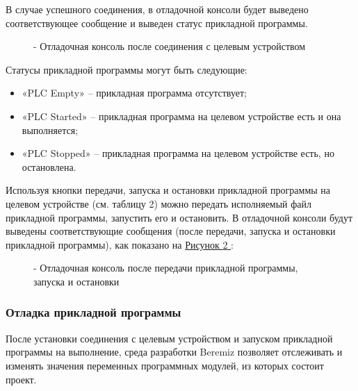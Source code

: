 \documentclass[letterpaper,10pt,russian]{sphinxmanual}
\begin{document}
В случае успешного соединения, в отладочной консоли будет выведено
соответствующее сообщение и выведен статус прикладной программы.
\begin{figure}[htbp]
\centering
\capstart

\noindent{}
\caption{- Отладочная консоль после соединения с целевым устройством}\label{usage_guide/work_with_project:image211}\end{figure}

Статусы прикладной программы могут быть следующие:
\begin{itemize}
\item {} 
«PLC Empty» – прикладная программа отсутствует;

\item {} 
«PLC Started» – прикладная программа на целевом устройстве есть и она
выполняется;

\item {} 
«PLC Stopped» – прикладная программа на целевом устройстве есть, но
остановлена.

\end{itemize}

Используя кнопки передачи, запуска и остановки прикладной программы на
целевом устройстве (см. таблицу 2) можно передать исполняемый файл
прикладной программы, запустить его и остановить. В отладочной консоли
будут выведены соответствующие сообщения (после передачи, запуска и
остановки прикладной программы), как показано на \hyperref[usage_guide/work_with_project:image212]{Рисунок \ref{usage_guide/work_with_project:image212} }:
\begin{figure}[htbp]
\centering
\capstart

\noindent{}
\caption{- Отладочная консоль после передачи прикладной программы, запуска и остановки}\label{usage_guide/work_with_project:image212}\end{figure}


\subsubsection{Отладка прикладной программы}
\label{usage_guide/work_with_project:id17}
После установки соединения с целевым устройством и запуском прикладной
программы на выполнение, среда разработки Beremiz позволяет отслеживать
и изменять значения переменных программных модулей, из которых состоит
проект.
\end{document}
